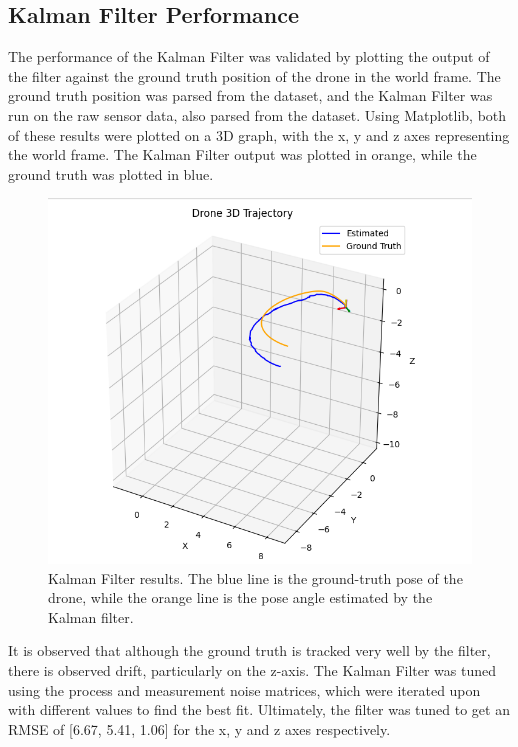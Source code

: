 \documentclass[bare_jrnl_transmag]{subfiles}
\begin{document}
\subsection{Kalman Filter Performance}
The performance of the Kalman Filter was validated by plotting the output of the filter against the ground truth position of the drone in the world frame. The ground truth position was parsed from the dataset, and the Kalman Filter was run on the raw sensor data, also parsed from the dataset. Using Matplotlib, both of these results were plotted on a 3D graph, with the x, y and z axes representing the world frame. The Kalman Filter output was plotted in orange, while the ground truth was plotted in blue. 

\begin{figure}[H]
    \centering
    \includegraphics[width=0.8\linewidth]{figures/ekf_results.png}
    \caption{Kalman Filter results. The blue line is the ground-truth pose of the drone, while the orange line is the pose angle estimated by the Kalman filter.}
    \label{fig:kalman_results}
\end{figure}

It is observed that although the ground truth is tracked very well by the filter, there is observed drift, particularly on the z-axis. The Kalman Filter was tuned using the process and measurement noise matrices, which were iterated upon with different values to find the best fit. Ultimately, the filter was tuned to get an RMSE of [6.67, 5.41, 1.06] for the x, y and z axes respectively.
\end{document}
